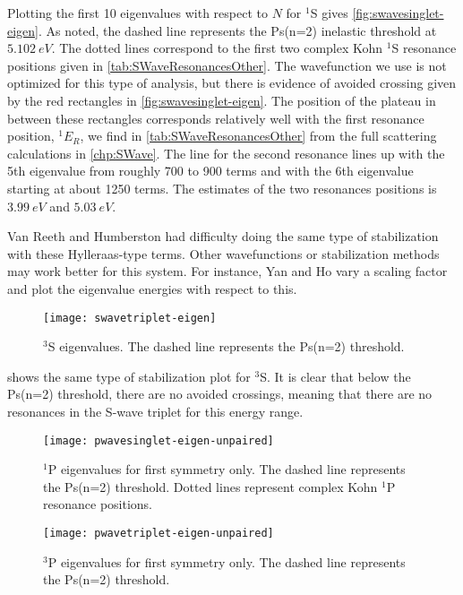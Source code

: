 \documentclass[Dissertation.tex]{subfiles}
\begin{document}
Plotting the first 10 eigenvalues with respect to $N$ for $^1$S gives
\cref{fig:swavesinglet-eigen}. As noted, the dashed line represents the Ps(n=2) 
inelastic threshold at $\SI{5.102}{eV}$. The dotted lines correspond to the 
first two complex Kohn $^1$S resonance positions given in
\cref{tab:SWaveResonancesOther}. The wavefunction we use is not optimized for this type of 
analysis, but there is evidence of avoided crossing given by the red 
rectangles in \cref{fig:swavesinglet-eigen}. The position of the plateau in 
between these rectangles corresponds relatively well with the first resonance 
position, $^1E_R$, we find in \cref{tab:SWaveResonancesOther} from the full 
scattering calculations in \cref{chp:SWave}. The line for the second 
resonance lines up with the 5th eigenvalue from roughly 700 to 900 terms and 
with the 6th eigenvalue starting at about 1250 terms. %
The estimates of the two resonances positions is $\SI{3.99}{eV}$ 
and $\SI{5.03}{eV}$.

Van Reeth and Humberston \cite{VanReeth2004} had difficulty doing the same 
type of stabilization with these Hylleraas-type terms. Other wavefunctions or 
stabilization methods may work better for this system. For instance, Yan and 
Ho \cite{Yan2003} vary a scaling factor and plot the eigenvalue energies
with respect to this.

\begin{figure}
	\centering
	\texttt{[image: swavetriplet-eigen]}
	\caption[$^3$S eigenvalues]{$^3$S eigenvalues. The dashed line represents the Ps(n=2) threshold.}
	\label{fig:swavetriplet-eigen}
\end{figure}

 shows the same type of stabilization plot for
$^3$S. It is clear that below the Ps(n=2) threshold, there are no avoided 
crossings, meaning that there are no resonances in the S-wave triplet for 
this energy range. 

\begin{figure}
	\centering
	\texttt{[image: pwavesinglet-eigen-unpaired]}
	\caption[$^1$P eigenvalues for first symmetry only]{$^1$P eigenvalues for first symmetry only. The dashed line represents the Ps(n=2) threshold. Dotted lines represent complex Kohn $^1$P resonance positions.}
	\label{fig:pwavesinglet-eigen-unpaired}
\end{figure}

\begin{figure}
	\centering
	\texttt{[image: pwavetriplet-eigen-unpaired]}
	\caption[$^3$P eigenvalues for first symmetry only]{$^3$P eigenvalues for first symmetry only. The dashed line represents the Ps(n=2) threshold.}
	\label{fig:pwavetriplet-eigen-unpaired}
\end{figure}
\end{document}
